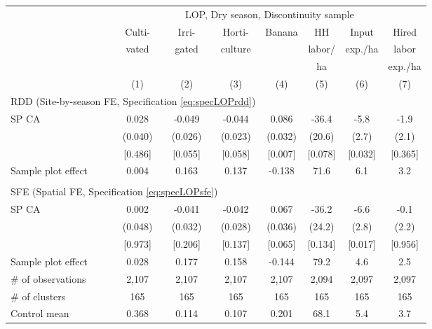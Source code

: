 \begin{tabular}{lccccccc}
\hline \hline
 & \multicolumn{7}{c}{LOP, Dry season, Discontinuity sample} \\
\cmidrule(lr){2-8}
 & Culti- & Irri- & Horti- & Banana & HH & Input & Hired \\
 & vated & gated & culture & & labor/ & exp./ha & labor \\
 & & & & & ha & & exp./ha \\
\cmidrule(lr){2-2}\cmidrule(lr){3-3}\cmidrule(lr){4-4}\cmidrule(lr){5-5}\cmidrule(lr){6-6}\cmidrule(lr){7-7}\cmidrule(lr){8-8}
 & (1) & (2) & (3) & (4) & (5) & (6) & (7) \\
\hline
\multicolumn{4}{l}{RDD (Site-by-season FE, Specification \ref{eq:specLOPrdd})} & & & & \\
\cmidrule(lr){1-4}
SP CA & 0.028 & -0.049\hphantom{-} & -0.044\hphantom{-} & 0.086 & -36.4\hphantom{-} & -5.8\hphantom{-} & -1.9\hphantom{-} \\
 & (0.040) & (0.026) & (0.023) & (0.032) & (20.6) & (2.7) & (2.1) \\
 & [0.486] & [0.055] & [0.058] & [0.007] & [0.078] & [0.032] & [0.365] \\
\cmidrule(lr){1-8}
Sample plot effect & 0.004 & 0.163 & 0.137 & -0.138 & 71.6 & 6.1 & 3.2 \\
\cmidrule(lr){1-8}
\\[-0.5em]
\multicolumn{4}{l}{SFE (Spatial FE, Specification \ref{eq:specLOPsfe})} & & & & \\
\cmidrule(lr){1-4}
SP CA & 0.002 & -0.041\hphantom{-} & -0.042\hphantom{-} & 0.067 & -36.2\hphantom{-} & -6.6\hphantom{-} & -0.1\hphantom{-} \\
 & (0.048) & (0.032) & (0.028) & (0.036) & (24.2) & (2.8) & (2.2) \\
 & [0.973] & [0.206] & [0.137] & [0.065] & [0.134] & [0.017] & [0.956] \\
\cmidrule(lr){1-8}
Sample plot effect & 0.028 & 0.177 & 0.158 & -0.144 & 79.2 & 4.6 & 2.5 \\
\hline
\# of observations & 2,107 & 2,107 & 2,107 & 2,107 & 2,094 & 2,097 & 2,097 \\
\# of clusters & 165 & 165 & 165 & 165 & 165 & 165 & 165 \\
Control mean & 0.368 & 0.114 & 0.107 & 0.201 & 68.1 & 5.4 & 3.7 \\
\hline
\end{tabular}
